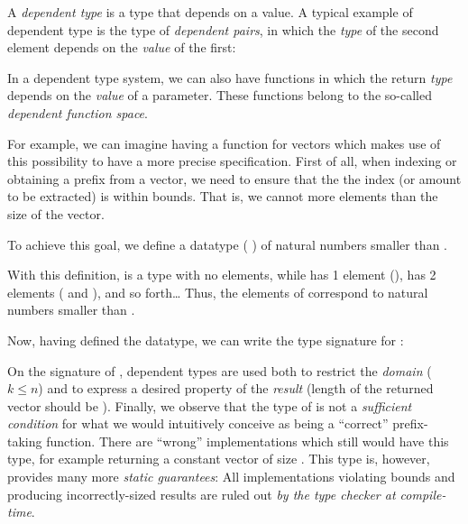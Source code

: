             A \emph{dependent type} is a type that depends on a value.
            A typical example of dependent type is the type of \emph{dependent pairs},
            in which the \emph{type} of the second element depends on the \emph{value} of the first:
            \begin{listing}[h]
            \end{listing}

            In a dependent type system, we can also have functions in which the return \emph{type}
            depends on the \emph{value} of a parameter.
            These functions belong to the so-called \emph{dependent function space}.

            For example, we can imagine having a  function for vectors which makes use
            of this possibility to have a more precise specification.
            First of all, when indexing or obtaining a prefix from a vector,
            we need to ensure that the the index (or amount to be extracted) is within bounds.
            That is, we cannot  more elements than the size of the vector.

            To achieve this goal, we define a datatype ( ) of natural numbers smaller than .
            \begin{listing}[h]
            \end{listing}

            With this definition,   is a type with no elements,
            while   has 1 element (),
              has 2 elements ( and  ), and so forth\ldots
            Thus, the elements of   correspond to natural numbers smaller than .

            Now, having defined the   datatype, we can write the type signature for :
            \begin{listing}[h]
            \end{listing}

            On the signature of , dependent types are used both to restrict the \emph{domain}
            ($ k \leq n $) and to express a desired property of the \emph{result}
            (length of the returned vector should be ).
            Finally, we observe that the type of  is not a \emph{sufficient condition} for
            what we would intuitively conceive as being a ``correct'' prefix-taking function.
            There are ``wrong'' implementations which still would have this type, for example
            returning a constant vector of size .
            This type is, however, provides many more \emph{static guarantees}:
            All implementations violating bounds and producing incorrectly-sized results
            are ruled out \emph{by the type checker at compile-time}.

